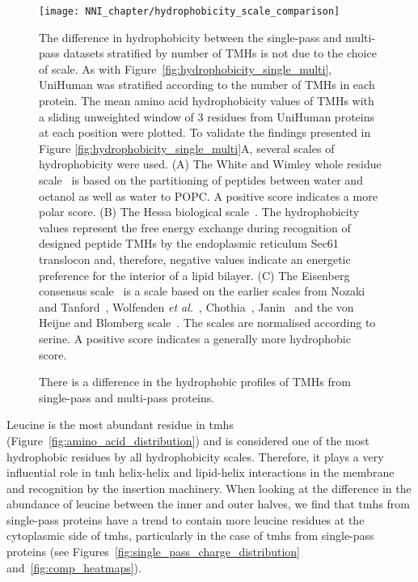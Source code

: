 \begin{figure}[!ht]
\centering
\texttt{[image: NNI\_chapter/hydrophobicity\_scale\_comparison]}
\caption{There is a difference in the hydrophobic profiles of TMHs from single-pass and multi-pass proteins.}
\medskip
\justify
\small
The difference in hydrophobicity between the single-pass and multi-pass datasets stratified by number of TMHs is not due to the choice of scale. As with Figure~\ref{fig:hydrophobicity_single_multi}, UniHuman was stratified according to the number of TMHs in each protein. The mean amino acid hydrophobicity values of TMHs with a sliding unweighted window of 3 residues from UniHuman proteins at each position were plotted. To validate the findings presented in Figure \ref{fig:hydrophobicity_single_multi}A, several scales of hydrophobicity were used. (A) The White and Wimley whole residue scale~\cite{White1999} is based on the partitioning of peptides between water and octanol as well as water to POPC. A positive score indicates a more polar score. (B) The Hessa biological scale~\cite{Hessa2005}. The hydrophobicity values represent the free energy exchange during recognition of designed peptide TMHs by the endoplasmic reticulum Sec61 translocon and, therefore, negative values indicate an energetic preference for the interior of a lipid bilayer. (C) The Eisenberg consensus scale~\cite{Eisenberg1984} is a scale based on the earlier scales from Nozaki and Tanford~\cite{Nozaki1971}, Wolfenden \textit{et al.}~\cite{Wolfenden1981}, Chothia~\cite{Chothia1976}, Janin~\cite{Janin1979} and the von Heijne and Blomberg scale~\cite{VonHeijne1979}. The scales are normalised according to serine. A positive score indicates a generally more hydrophobic score.
\label{fig:hydrophobicity_scale_comparison}
\end{figure}

Leucine is the most abundant residue in \gls{tmh}s (Figure~\ref{fig:amino_acid_distribution}) and is considered one of the most hydrophobic residues by all hydrophobicity scales. Therefore, it plays a very influential role in \gls{tmh} helix-helix and lipid-helix interactions in the membrane and recognition by the insertion machinery. When looking at the difference in the abundance of leucine between the inner and outer halves, we find that \gls{tmh}s from single-pass proteins have a trend to contain more leucine residues at the cytoplasmic side of \gls{tmh}s, particularly in the case of \gls{tmh}s from single-pass proteins (see Figures~\ref{fig:single_pass_charge_distribution} and~\ref{fig:comp_heatmaps}).

